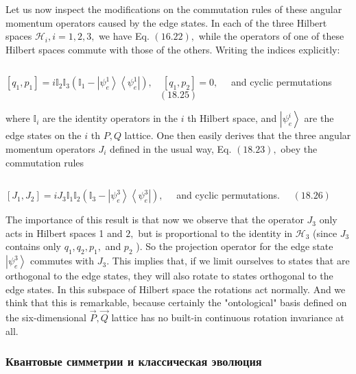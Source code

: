 \documentclass[main.tex]{subfiles}
\begin{document}
Let us now inspect the modifications on the commutation rules of these angular momentum operators caused by the edge states. In each of the three Hilbert spaces $\mathcal{H}_{i}, i=1,2,3,$ we have Eq. $(16.22),$ while the operators of one of these Hilbert spaces commute with those of the others. Writing the indices explicitly:

\begin{equation}\label{}
	
\end{equation}


$\left[q_{1}, p_{1}\right]=i \mathbb{I}_{2} \mathbb{I}_{3}\left(\mathbb{I}_{1}-\left|\psi_{e}^{1}\right\rangle\left\langle\psi_{e}^{1}\right|\right), \quad\left[q_{1}, p_{2}\right]=0, \quad$ and cyclic permutations
$$
(18.25)
$$

where $\mathbb{I}_{i}$ are the identity operators in the $i$ th Hilbert space, and $\left|\psi_{e}^{i}\right\rangle$ are the edge states on the $i$ th $P, Q$ lattice. One then easily derives that the three angular momentum operators $J_{i}$ defined in the usual way, Eq. $(18.23),$ obey the commutation rules

\begin{equation}\label{}
	
\end{equation}

$\left[J_{1}, J_{2}\right]=i J_{3} \mathbb{I}_{1} \mathbb{I}_{2}\left(\mathbb{I}_{3}-\left|\psi_{e}^{3}\right\rangle\left\langle\psi_{e}^{3}\right|\right), \quad$ and cyclic permutations. $\quad(18.26)$


The importance of this result is that now we observe that the operator $J_{3}$ only acts in Hilbert spaces 1 and $2,$ but is proportional to the identity in $\mathcal{H}_{3}$ (since $J_{3}$ contains only $q_{1}, q_{2}, p_{1},$ and $p_{2}$ ). So the projection operator for the edge state $\left|\psi_{e}^{3}\right\rangle$ commutes with $J_{3} .$ This implies that, if we limit ourselves to states that are orthogonal to the edge states, they will also rotate to states orthogonal to the edge states. In this subspace of Hilbert space the rotations act normally. And we think that this is remarkable, because certainly the "ontological" basis defined on the six-dimensional
$\vec{P}, \vec{Q}$ lattice has no built-in continuous rotation invariance at all.


\subsubsection{Квантовые симметрии и классическая эволюция}\label{ch18.2.5}
\end{document}
